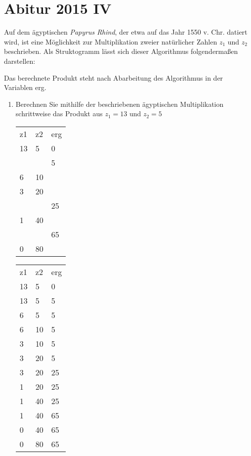 \documentclass{lehramt-informatik-aufgabe}
\begin{document}

%

\section{Abitur 2015 IV}

Auf dem ägyptischen \emph{Papyrus Rhind}, der etwa auf das Jahr 1550 v.
Chr. datiert wird, ist eine Möglichkeit zur Multiplikation zweier
natürlicher Zahlen $z_1$ und $z_2$ beschrieben. Als Struktogramm
lässt sich dieser Algorithmus folgendermaßen darstellen:

Das berechnete Produkt steht nach Abarbeitung des Algorithmus in der
Variablen erg.

\begin{enumerate}


\item Berechnen Sie mithilfe der beschriebenen ägyptischen
Multiplikation schrittweise das Produkt aus $z_1 = 13$ und $z_2 = 5$

\begin{liAntwort}
\begin{tabular}{lll}
z1 & z2 & erg \\
13 & 5  & 0   \\
   &    & 5   \\
6  & 10 &     \\
3  & 20 &     \\
   &    & 25  \\
1  & 40 &     \\
   &    & 65  \\
0  & 80 &
\end{tabular}

\begin{tabular}{lll}
z1 & z2 & erg \\
13 & 5  & 0   \\
13 & 5  & 5   \\
6  & 5  & 5   \\
6  & 10 & 5   \\
3  & 10 & 5   \\
3  & 20 & 5   \\
3  & 20 & 25  \\
1  & 20 & 25  \\
1  & 40 & 25  \\
1  & 40 & 65  \\
0  & 40 & 65  \\
0  & 80 & 65
\end{tabular}
\end{liAntwort}


\end{enumerate}
\end{document}
